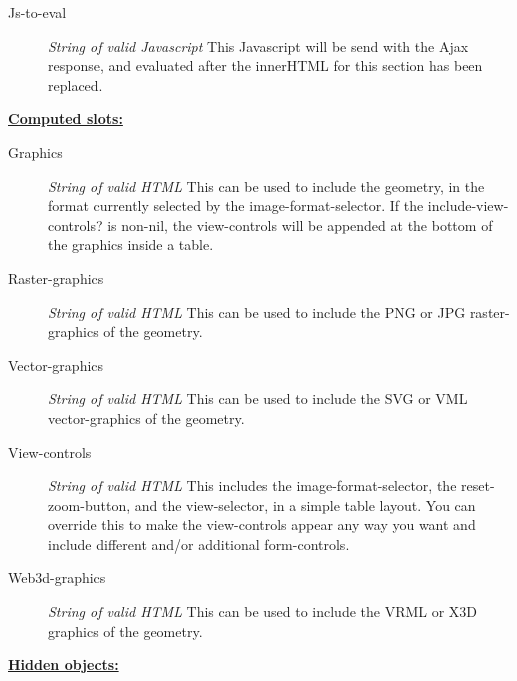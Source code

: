 \documentclass [11pt]{book}
\begin{document}
\begin{itemize}
\begin{description}
\item [Js-to-eval]
\emph{String of valid Javascript} This Javascript will be send with the Ajax response,
and evaluated after the innerHTML for this section has been replaced.


\end{description}






\textbf{
\underline{Computed slots:}}

\begin{description}

\item [Graphics]
\emph{String of valid HTML} This can be used to
include the geometry, in the format currently selected by the image-format-selector.
If the include-view-controls? is non-nil, the view-controls will be appended at the
bottom of the graphics inside a table.


\item [Raster-graphics]
\emph{String of valid HTML} This can be used to
include the PNG or JPG raster-graphics of the geometry.


\item [Vector-graphics]
\emph{String of valid HTML} This can be used to
include the SVG or VML vector-graphics of the geometry.


\item [View-controls]
\emph{String of valid HTML} This includes the image-format-selector, the reset-zoom-button,
and the view-selector, in a simple table layout. You can override this to make the view-controls
appear any way you want and include different and/or additional form-controls.


\item [Web3d-graphics]
\emph{String of valid HTML} This can be used to
include the VRML or X3D graphics of the geometry.


\end{description}






\textbf{
\underline{Hidden objects:}}

\begin{description}


\end{description}
\end{itemize}
\end{document}
